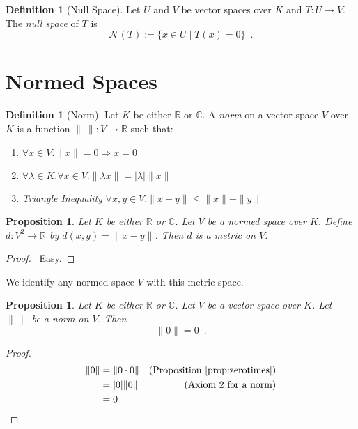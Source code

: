 \documentclass{book}
\let\qed\relax
\newtheorem{prop}[ax]{Proposition}
\theoremstyle{definition}
\newtheorem{df}[ax]{Definition}
\begin{document}
\begin{df}[Null Space]
Let $U$ and $V$ be vector spaces over $K$ and $T : U \rightarrow V$. The \emph{null space} of $T$ is
\[ \mathcal{N}(T) := \{ x \in U \mid T(x) = 0 \} \enspace . \]
\end{df}

\section{Normed Spaces}

\begin{df}[Norm]
Let $K$ be either $\mathbb{R}$ or $\mathbb{C}$.
A \emph{norm} on a vector space $V$ over $K$ is a function $\| \ \| : V \rightarrow \mathbb{R}$ such that:
\begin{enumerate}
\item $\forall x \in V. \| x \| = 0 \Rightarrow x = 0$
\item $\forall \lambda \in K. \forall x \in V. \| \lambda x \| = |\lambda| \| x \|$
\item \emph{Triangle Inequality} $\forall x,y \in V. \| x + y \| \leq \| x \| + \| y \|$
\end{enumerate}
\end{df}

\begin{prop}
Let $K$ be either $\mathbb{R}$ or $\mathbb{C}$. Let $V$ be a normed space over $K$. Define $d : V^2 \rightarrow \mathbb{R}$ by $d(x,y) = \| x-y \|$. Then $d$ is a metric on $V$.
\end{prop}

\begin{proof}
\pf\ Easy. \qed
\end{proof}

We identify any normed space $V$ with this metric space.

\begin{prop}
\label{prop:normzero}
Let $K$ be either $\mathbb{R}$ or $\mathbb{C}$. Let $V$ be a vector space over $K$. Let $\|\ \|$ be a norm on $V$. Then
\[ \| 0 \| = 0 \enspace . \]
\end{prop}

\begin{proof}
\pf
\begin{align*}
\| 0 \| & = \| 0 \cdot 0 \| & (\text{Proposition \ref{prop:zerotimes}}) \\
& = |0| \| 0 \| & (\text{Axiom 2 for a norm}) \\
& = 0 & \qed
\end{align*}
\end{proof}
\end{document}
